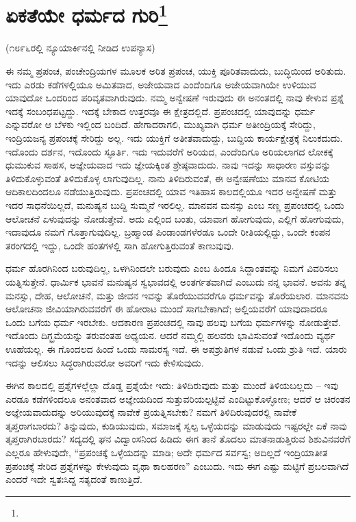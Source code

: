 
\chapter[ಏಕತೆಯೇ ಧರ್ಮದ ಗುರಿ]{ಏಕತೆಯೇ ಧರ್ಮದ ಗುರಿ\protect\footnote{}}

\begin{center}
(೧೮೯೬ರಲ್ಲಿ ನ್ಯೂಯಾರ್ಕಿನಲ್ಲಿ ನೀಡಿದ ಉಪನ್ಯಾಸ)
\end{center}

\vskip -1pt

ಈ ನಮ್ಮ ಪ್ರಪಂಚ, ಪಂಚೇಂದ್ರಿಯಗಳ ಮೂಲಕ ಅರಿತ ಪ್ರಪಂಚ, ಯುಕ್ತಿ ಪೂರಿತವಾದುದು, ಬುದ್ಧಿಯಿಂದ ಅರಿತುದು. ಇದು ಎರಡು ಕಡೆಗಳಲ್ಲಿಯೂ ಅಮಿತವಾದ, ಅಜೇಯವಾದ ಎಂದೆಂದಿಗೂ ಅಜೇಯವಾಗಿಯೇ ಉಳಿಯುವ ಯಾವುದೋ ಒಂದರಿಂದ ಪರಿವೃತವಾಗಿರುವುದು. ನಮ್ಮ ಅನ್ವೇಷಣೆ ಇರುವುದು ಈ ಅನಂತದಲ್ಲಿ ನಾವು ಕೇಳುವ ಪ್ರಶ್ನೆ ಇದಕ್ಕೆ ಸಂಬಂಧಪಟ್ಟದ್ದು. ಇದಕ್ಕೆ ಬೇಕಾದ ಉತ್ತರವೂ ಈ ಕ್ಷೇತ್ರದಲ್ಲಿದೆ. ಪ್ರಪಂಚದಲ್ಲಿ ಯಾವುದನ್ನು ಧರ್ಮ ಎನ್ನುವರೋ ಆ ಬೆಳಕು ಇಲ್ಲಿಂದ ಬಂದಿದೆ. ಹೇಗಾದರಾಗಲಿ, ಮುಖ್ಯವಾಗಿ ಧರ್ಮ ಅತೀಂದ್ರಿಯಕ್ಕೆ ಸೇರಿದ್ದು, ಇಂದ್ರಿಯಜನ್ಯ ಪ್ರಪಂಚಕ್ಕೆ ಸೇರಿದ್ದು ಅಲ್ಲ. ಇದು ಯುಕ್ತಿಗೆ ಅತೀತವಾದುದ್ದು, ಬುದ್ದಿಯ ಕಾರ್ಯಕ್ಷೇತ್ರಕ್ಕೆ ನಿಲುಕದುದು. ಇದೊಂದು ದರ್ಶನ, ಇದೊಂದು ಸ್ಫೂರ್ತಿ. ಇದು ಇದುವರೆಗೆ ಅರಿಯದ, ಎಂದೆಂದಿಗೂ ಅರಿಯಲಾಗದ ಲೋಕಕ್ಕೆ ಧುಮುಕುವ ಸಾಹಸ, ಅಜ್ಞೇಯವಾದ ಇದು ಜ್ಞೇಯಕ್ಕಿಂತ ಶ್ರೇಷ್ಠವಾದುದು. ನಾವು ಇದನ್ನು ಸಾಧಾರಣ ವಸ್ತುವನ್ನು ತಿಳಿದುಕೊಳ್ಳುವಂತೆ ತಿಳಿದುಕೊಳ್ಳ ಲಾಗುವುದಿಲ್ಲ. ನಾನು ತಿಳಿದಿರುವಂತೆ, ಈ ಅನ್ವೇಷಣೆಯು ಮಾನವ ಕೋಟಿಯ ಆದಿಕಾಲದಿಂದಲೂ ನಡೆಯುತ್ತಿರುವುದು. ಪ್ರಪಂಚದಲ್ಲಿ ಯಾವ ಇತಿಹಾಸ ಕಾಲದಲ್ಲಿಯೂ ಇದರ ಅನ್ವೇಷಣೆ ಮತ್ತು ಇದರ ಸಾಧನೆಯಿಲ್ಲದೆ, ಮನುಷ್ಯನ ಬುದ್ದಿ ಸುಮ್ಮನೆ ಇರಲಿಲ್ಲ. ಮಾನವನ ಮನಸ್ಸು ಎಂಬ ಸಣ್ಣ ಪ್ರಪಂಚದಲ್ಲಿ ಒಂದು ಆಲೋಚನೆ ಏಳುವುದನ್ನು ನೋಡುತ್ತೇವೆ. ಅದು ಎಲ್ಲಿಂದ ಬಂತು, ಯಾವಾಗ ಹೋಗುವುದು, ಎಲ್ಲಿಗೆ ಹೋಗುವುದು, ಇದಾವುದೂ ನಮಗೆ ಗೊತ್ತಾಗುವುದಿಲ್ಲ. ಬ್ರಹ್ಮಾಂಡ ಪಿಂಡಾಂಡಗಳೆರಡೂ ಒಂದೇ ರೀತಿಯಲ್ಲಿದ್ದು, ಒಂದೇ ಕಂಪನ ತರಂಗದಲ್ಲಿ ಇದ್ದು, ಒಂದೇ ಹಂತಗಳಲ್ಲಿ ಸಾಗಿ ಹೋಗುತ್ತಿರುವಂತೆ ಕಾಣುವುವು.

\vskip -1pt

ಧರ್ಮ ಹೊರಗಿನಿಂದ ಬರುವುದಿಲ್ಲ, ಒಳಗಿನಿಂದಲೇ ಬರುವುದು ಎಂಬ ಹಿಂದೂ ಸಿದ್ದಾಂತವನ್ನು ನಿಮಗೆ ವಿವರಿಸಲು ಯತ್ನಿಸುತ್ತೇನೆ. ಧಾರ್ಮಿಕ ಭಾವನೆ ಮನುಷ್ಯನ ಸ್ವಭಾವದಲ್ಲಿ ಅಂತರ್ಗತವಾಗಿದೆ ಎಂಬುದು ನನ್ನ ಭಾವನೆ. ಅವನು ತನ್ನ ಮನಸ್ಸು, ದೇಹ, ಆಲೋಚನೆ, ಮತ್ತು ಜೀವನ ಇವನ್ನು ತೊರೆಯುವವರೆಗೂ ಧರ್ಮವನ್ನು ತೊರೆಯಲಾರ. ಮಾನವನು ಆಲೋಚನಾ ಜೀವಿಯಾಗಿರುವವರೆಗೆ ಈ ಹೋರಾಟ ಮುಂದೆ ಸಾಗಬೇಕಾಗಿದೆ; ಅಲ್ಲಿಯವರೆಗೆ ಯಾವುದಾದರೂ ಒಂದು ಬಗೆಯ ಧರ್ಮ ಇರಬೇಕು. ಆದಕಾರಣ ಪ್ರಪಂಚದಲ್ಲಿ ನಾವು ಹಲವು ಬಗೆಯ ಧರ್ಮಗಳನ್ನು ನೋಡುತ್ತೇವೆ. ಇದೊಂದು ದಿಗ್ಭ್ರಮೆಯನ್ನು ತರುವಂತಹ ಅಧ್ಯಯನ. ಆದರೆ ನಮ್ಮಲ್ಲಿ ಹಲವರು ಭಾವಿಸುವಂತೆ ಇದೊಂದು ವ್ಯರ್ಥ ಊಹೆಯಲ್ಲ. ಈ ಗೊಂದಲದ ಹಿಂದೆ ಒಂದು ಸಾಮರಸ್ಯ ಇದೆ. ಈ ಅಪಶ್ರುತಿಗಳ ನಡುವೆ ಒಂದು ಶ್ರುತಿ ಇದೆ. ಯಾರು ಇದನ್ನು ಆಲಿಸಲು ಸಿದ್ಧರಾಗಿರುವರೋ ಅವರಿಗೆ ಇದು ಕೇಳಿಸುವುದು.

\vskip -1pt

ಈಗಿನ ಕಾಲದಲ್ಲಿ ಪ್ರಶ್ನೆಗಳಲ್ಲೆಲ್ಲಾ ದೊಡ್ಡ ಪ್ರಶ್ನೆಯೇ ಇದು: ತಿಳಿದಿರುವುದು ಮತ್ತು ಮುಂದೆ ತಿಳಿಯಬಲ್ಲದು – ಇವು ಎರಡೂ ಕಡೆಗಳಿಂದಲೂ ಅನಂತವಾದ ಅಜ್ಞೇಯದಿಂದ ಸುತ್ತುವರಿಯಲ್ಪಟ್ಟಿವೆ ಎಂದಿಟ್ಟುಕೊಳ್ಳೋಣ; ಆದರೆ ಆ ಚಿರಂತನ ಅಜ್ಞೇಯವಾದುದನ್ನು ಅರಿಯುವುದಕ್ಕೆ ನಾವೇಕೆ ಪ್ರಯತ್ನಿಸಬೇಕು? ನಮಗೆ ತಿಳಿದಿರುವುದರಲ್ಲಿ ನಾವೇಕೆ ತೃಪ್ತರಾಗಬಾರದು? ತಿನ್ನುವುದು, ಕುಡಿಯುವುದು, ಸಮಾಜಕ್ಕೆ ಸ್ವಲ್ಪ ಒಳ್ಳೆಯದನ್ನು ಮಾಡುವುದು ಇಷ್ಟರಲ್ಲೇ ಏಕೆ ನಾವು ತೃಪ್ತರಾಗಿರಬಾರದು? ಸದ್ಯದಲ್ಲಿ ಘನ ವಿದ್ವಾಂಸನಿಂದ ಹಿಡಿದು ಈಗ ತಾನೆ ತೊದಲು ಮಾತನಾಡುತ್ತಿರುವ ಶಿಶುವಿನವರೆಗೆ ಎಲ್ಲರೂ ಹೇಳುವುದೇ, “ಪ್ರಪಂಚಕ್ಕೆ ಒಳ್ಳೆಯದನ್ನು ಮಾಡಿ; ಅದೇ ಧರ್ಮದ ಸರ್ವಸ್ವ; ಅದಿಲ್ಲದೆ ಇಂದ್ರಿಯಾತೀತ ಪ್ರಪಂಚಕ್ಕೆ ಸೇರಿದ ಪ್ರಶ್ನೆಗಳನ್ನು ಕೇಳುವುದು ವೃಥಾ ಕಾಲಹರಣ'' ಎಂಬುದು. ಇದು ಈಗ ಎಷ್ಟು ಮಟ್ಟಿಗೆ ಪ್ರಬಲವಾಗಿದೆ ಎಂದರೆ ಇದೇ ಸ್ವತಃಸಿದ್ದ ಸತ್ಯದಂತೆ ಕಾಣುತ್ತಿದೆ.

